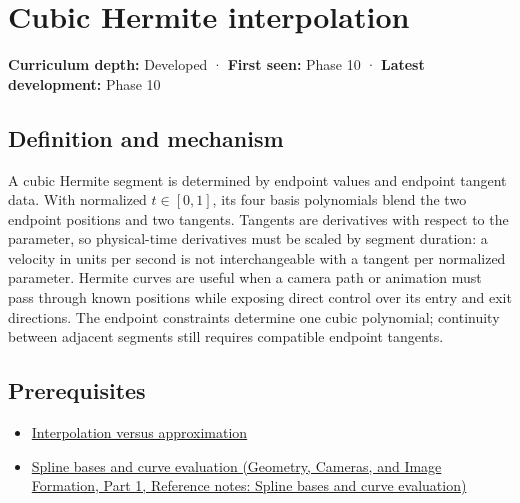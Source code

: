 \hypertarget{appendix-db3aef8f2fd6}{}\label{referencestart:appendix-db3aef8f2fd6}
\section{Cubic Hermite interpolation}\label{appendix-db3aef8f2fd6-cubic-hermite-interpolation}

\hypertarget{appendix-db3aef8f2fd6-cubic-hermite-interpolation}{}

\textbf{Curriculum depth:} Developed · \textbf{First seen:} Phase 10 · \textbf{Latest development:} Phase 10

\begin{allmightroledefinition}

\subsection{Definition and mechanism}\label{appendix-db3aef8f2fd6-definition-and-mechanism}

\hypertarget{appendix-db3aef8f2fd6-definition-and-mechanism}{}

A cubic Hermite segment is determined by endpoint values and endpoint tangent data. With normalized \(t\in[0,1]\), its four basis polynomials blend the two endpoint positions and two tangents. Tangents are derivatives with respect to the parameter, so physical-time derivatives must be scaled by segment duration: a velocity in units per second is not interchangeable with a tangent per normalized parameter. Hermite curves are useful when a camera path or animation must pass through known positions while exposing direct control over its entry and exit directions. The endpoint constraints determine one cubic polynomial; continuity between adjacent segments still requires compatible endpoint tangents.

\end{allmightroledefinition}

\subsection{Prerequisites}\label{appendix-db3aef8f2fd6-prerequisites}

\hypertarget{appendix-db3aef8f2fd6-prerequisites}{}

\begin{itemize}
\tightlist
\item
  \hyperref[appendix-0c2a5f69851e]{Interpolation versus approximation}
\item
  \href{../03-Geometry-Cameras-and-Image-Formation-P01/main.pdf\#nameddest=appendix-f28eeec97a3d}{Spline bases and curve evaluation (Geometry, Cameras, and Image Formation, Part 1, Reference notes: Spline bases and curve evaluation)}
\end{itemize}


